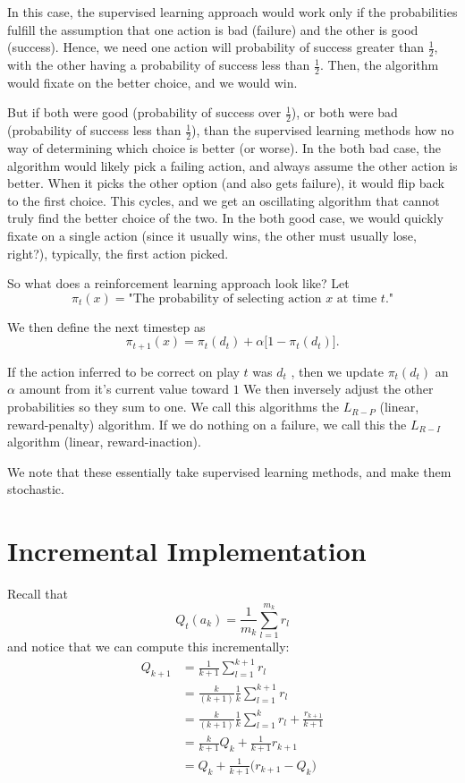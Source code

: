 \documentclass[11pt]{article}
\theoremstyle{definition}
\begin{document}
In this case, the supervised learning approach would work only if the probabilities fulfill the assumption that one action is bad (failure) and the other is good (success). Hence, we need one action will probability of success greater than $\frac{1}{2}$, with the other having a probability of success less than $\frac{1}{2}$. Then, the algorithm would fixate on the better choice, and we would win.

But if both were good (probability of success over $\frac{1}{2}$), or both were bad (probability of success less than $\frac{1}{2}$), than the supervised learning methods how no way of determining which choice is better (or worse). In the both bad case, the algorithm would likely pick a failing action, and always assume the other action is better. When it picks the other option (and also gets failure), it would flip back to the first choice. This cycles, and we get an oscillating algorithm that cannot truly find the better choice of the two. In the both good case, we would quickly fixate on a single action (since it usually wins, the other must usually lose, right?), typically, the first action picked.

So what does a reinforcement learning approach look like? Let
\[
\pi_t(x) = \text{"The probability of selecting action }x\text{ at time }t\text{."}
\]

We then define the next timestep as
\[
\pi_{t+1}(x) = \pi_t(d_t) + \alpha\Big[1 - \pi_t(d_t)\Big].
\]

If the action inferred to be correct on play $t$ was $d_t$ , then we update $\pi_t(d_t)$ an $\alpha$ amount from it's current value toward $1$ We then inversely adjust the other probabilities so they sum to one. We call this algorithms the $L_{R-P}$ (linear, reward-penalty) algorithm. If we do nothing on a failure, we call this the $L_{R-I}$ algorithm (linear, reward-inaction).

We note that these essentially take supervised learning methods, and make them stochastic.

\section*{\textcolor{CalPolyGreen}{Incremental Implementation}}

Recall that
\[
    Q_t(a_k) = \frac{1}{m_k} \sum_{l=1}^{m_k} r_l
\]
and notice that we can compute this incrementally:
\begin{align*}
    Q_{k+1} &= \frac{1}{k+1} \sum_{l=1}^{k+1} r_l    \\
    &= \frac{k}{(k+1)}\frac{1}{k} \sum_{l=1}^{k+1} r_l	\\
    &= \frac{k}{(k+1)}\frac{1}{k} \sum_{l=1}^k r_l + \frac{r_{k+1}}{k+1} \\
    &= \frac{k}{k+1} Q_k + \frac{1}{k+1} r_{k+1}    \\
    &= Q_k + \frac{1}{k+1}\Big(r_{k+1} - Q_k\Big)   \\
\end{align*}
\end{document}
